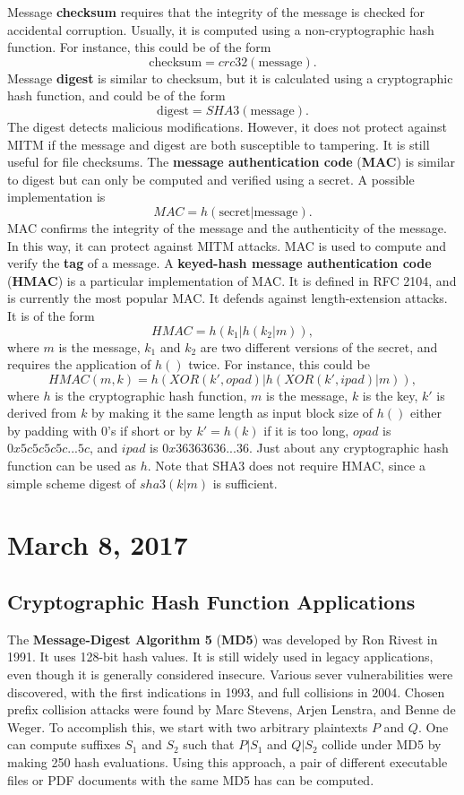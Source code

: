 \documentclass[11pt]{article}
\theoremstyle{plain} %
\theoremstyle{definition}
\theoremstyle{example}
\theoremstyle{remark}
\begin{document}
Message \textbf{checksum} requires that the integrity of the message is checked for accidental corruption. Usually, it is computed using a non-cryptographic hash function. For instance, this could be of the form 
$$\text{checksum} = crc32(\text{message}).$$
Message \textbf{digest} is similar to checksum, but it is calculated using a cryptographic hash function, and could be of the form 
$$\text{digest} = SHA3(\text{message}).$$The digest detects malicious modifications. However, it does not protect against MITM if the message and digest are both susceptible to tampering. It is still useful for file checksums. The \textbf{message authentication code} (\textbf{MAC}) is similar to digest but can only be computed and verified using a secret. A possible implementation is 
$$MAC = h(\text{secret} | \text{message}).$$
MAC confirms the integrity of the message and the authenticity of the message. In this way, it can protect against MITM attacks. MAC is used to compute and verify the \textbf{tag} of a message. A \textbf{keyed-hash message authentication code} (\textbf{HMAC}) is a particular implementation of MAC. It is defined in RFC 2104, and is currently the most popular MAC. It defends against length-extension attacks. It is of the form 
$$HMAC = h(k_1 | h(k_2|m)),$$
where $m$ is the message, $k_1$ and $k_2$ are two different versions of the secret, and requires the application of $h()$ twice. For instance, this could be 
$$HMAC(m,k) = h(XOR(k',opad)|h(XOR(k',ipad)|m)),$$
where $h$ is the cryptographic hash function, $m$ is the message, $k$ is the key, $k'$ is derived from $k$ by making it the same length as input block size of $h()$ either by padding with 0's if short or by $k'=h(k)$ if it is too long, $opad$ is $0x5c5c5c5c...5c$, and $ipad$ is $0x36363636...36$. Just about any cryptographic hash function can be used as $h$. Note that SHA3 does not require HMAC, since a simple scheme digest of $sha3(k|m)$ is sufficient.




\section{March 8, 2017}
\subsection{Cryptographic Hash Function Applications}

The \textbf{Message-Digest Algorithm 5} (\textbf{MD5}) was developed by Ron Rivest in 1991. It uses 128-bit hash values. It is still widely used in legacy applications, even though it is generally considered insecure. Various sever vulnerabilities were discovered, with the first indications in 1993, and full collisions in 2004. Chosen prefix collision attacks were found by Marc Stevens, Arjen Lenstra, and Benne de Weger. To accomplish this, we start with two arbitrary plaintexts $P$ and $Q$. One can compute suffixes $S_1$ and $S_2$ such that $P|S_1$ and $Q|S_2$ collide under MD5 by making 250 hash evaluations. Using this approach, a pair of different executable files or PDF documents with the same MD5 has can be computed. 
\end{document}
